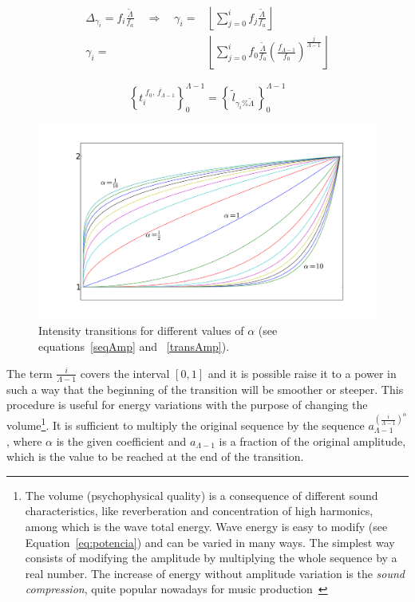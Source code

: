 \begin{equation}\label{indiceExponencial}
\begin{split}
 \Delta_{\gamma_i}= f_i\frac{\widetilde{\Lambda}}{f_a} \quad \Rightarrow  \quad \gamma_i= & \left \lfloor \sum_{j=0}^{i} f_j\frac{\widetilde{\Lambda}}{f_a} \right \rfloor \\ \gamma_i = & \left \lfloor \sum_{j=0}^{i} f_0 \frac{\widetilde{\Lambda}}{f_a} \left ( \frac{f_{\Lambda-1}}{f_0} \right ) ^{\frac{j}{\Lambda -1}} \right \rfloor
\end{split}
\end{equation}

\begin{equation}\label{serieAmostralLog}
 \left\{t_i^{\;\overline{f_0,\,f_{\Lambda-1}}}\right\}_0^{\Lambda-1}=\left\{\,\widetilde{l}_{\gamma_i \% \widetilde{\Lambda}}\,\right\}_0^{\Lambda-1}
\end{equation}

\begin{figure}[h!]
     \centering
         \includegraphics[width=\columnwidth]{figures/transicao}
     \caption{Intensity transitions for different values of $\alpha$ (see equations~\ref{seqAmp} and ~\ref{transAmp}).}
         \label{fig:transicao}
\end{figure}

The term $\frac{i}{\Lambda-1}$ covers the interval $[0,1]$ and it is possible raise it to a power in such a way that the beginning of the transition will be smoother or steeper. This procedure is useful for energy variations with the purpose of changing the volume\footnote{The volume (psychophysical quality) is a consequence of different sound characteristics, like reverberation and concentration of high harmonics, among which is the wave total energy. Wave energy is easy to modify (see Equation~\ref{eq:potencia}) and can be varied in many ways. The simplest way consists of modifying the amplitude by multiplying the whole sequence by a real number. The increase of energy without amplitude variation is the \emph{sound compression}, quite popular nowadays for music production~\cite{guillaume}}. It is sufficient to multiply the original sequence by the sequence $a_{\Lambda-1}^{\left( \frac{i}{\Lambda-1} \right )^\alpha}$, where $\alpha$ is the given coefficient and $a_{\Lambda-1}$ is a fraction of the original amplitude, which is the value to be reached at the end of the transition.

